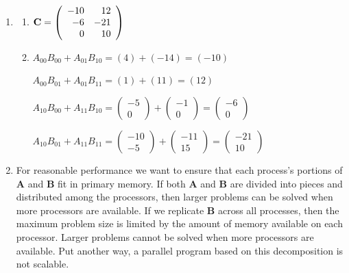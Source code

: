 \begin{enumerate}
\item
\begin{enumerate}
\item

\( {\bf C} = \left( \begin{array}{rr}
                    -10 & 12   \\
                    -6 & -21  \\
                     0 &  10  \end{array}\right)\)

\item

\( A_{00}B_{00} + A_{01}B_{10} = ( 4 ) + ( -14 ) = ( -10 ) \)

\( A_{00}B_{01} + A_{01}B_{11} = ( 1 ) + ( 11 ) = ( 12 ) \)

\( A_{10}B_{00} + A_{11}B_{10} = 
\left( \begin{array}{r}
-5 \\
0 \end{array}\right)
+
\left( \begin{array}{r}
-1 \\
0 \end{array}\right)
=
\left( \begin{array}{r}
-6 \\
0 \end{array}\right) \)

\( A_{10}B_{01} + A_{11}B_{11} = 
\left( \begin{array}{r}
-10 \\
-5 \end{array}\right)
+
\left( \begin{array}{r}
-11 \\
15 \end{array}\right)
=
\left( \begin{array}{r}
-21 \\
10 \end{array}\right) \)
\end{enumerate}

\item For reasonable performance we want to ensure that each process's
      portions of {\bf A} and {\bf B} fit in primary memory.
      If both {\bf A} and {\bf B} are divided into pieces and distributed
      among the processors, then larger problems can be solved when more
      processors are available.
      If we replicate {\bf B} across all processes, then the maximum problem
      size is limited by the amount of memory available on each processor.
      Larger problems cannot be solved when more processors are available.
      Put another way, a parallel program based on this decomposition is
      not scalable.


\end{enumerate}
